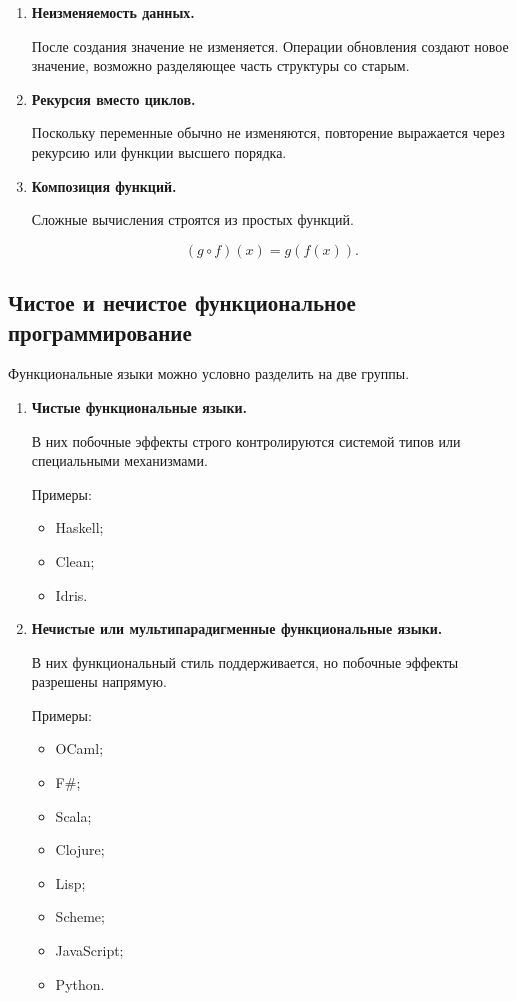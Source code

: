 \documentclass[12pt,a4paper]{article}
\begin{document}
\begin{enumerate}
  Например, если
  \[
  f(2) = 5,
  \]
  то в чистом функциональном языке выражение \texttt{f(2)} можно заменить на \texttt{5}.

  \item \textbf{Неизменяемость данных.}

  После создания значение не изменяется. Операции обновления создают новое значение, возможно разделяющее часть структуры со старым.

  \item \textbf{Рекурсия вместо циклов.}

  Поскольку переменные обычно не изменяются, повторение выражается через рекурсию или функции высшего порядка.

  \item \textbf{Композиция функций.}

  Сложные вычисления строятся из простых функций.

  \[
  (g \circ f)(x) = g(f(x)).
  \]
\end{enumerate}

\subsection{Чистое и нечистое функциональное программирование}

Функциональные языки можно условно разделить на две группы.

\begin{enumerate}
  \item \textbf{Чистые функциональные языки.}

  В них побочные эффекты строго контролируются системой типов или специальными механизмами.

  Примеры:
  \begin{itemize}
    \item Haskell;
    \item Clean;
    \item Idris.
  \end{itemize}

  \item \textbf{Нечистые или мультипарадигменные функциональные языки.}

  В них функциональный стиль поддерживается, но побочные эффекты разрешены напрямую.

  Примеры:
  \begin{itemize}
    \item OCaml;
    \item F\#;
    \item Scala;
    \item Clojure;
    \item Lisp;
    \item Scheme;
    \item JavaScript;
    \item Python.
  \end{itemize}
\end{enumerate}
\end{document}
